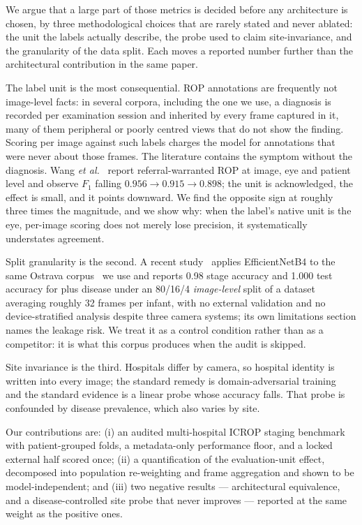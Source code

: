 \documentclass{article}
\begin{document}
We argue that a large part of those metrics is decided before any architecture is
chosen, by three methodological choices that are rarely stated and never ablated:
the unit the labels actually describe, the probe used to claim site-invariance,
and the granularity of the data split. Each moves a reported number further than
the architectural contribution in the same paper.

The label unit is the most consequential. ROP annotations are frequently not
image-level facts: in several corpora, including the one we use, a diagnosis is
recorded per examination session and inherited by every frame captured in it,
many of them peripheral or poorly centred views that do not show the finding.
Scoring per image against such labels charges the model for annotations that were
never about those frames. The literature contains the symptom without the
diagnosis. Wang \emph{et al.}~\cite{wang2021} report referral-warranted ROP at
image, eye and patient level and observe $F_1$ falling $0.956 \rightarrow 0.915
\rightarrow 0.898$; the unit is acknowledged, the effect is small, and it points
downward. We find the opposite sign at roughly three times the magnitude, and we
show why: when the label's native unit is the eye, per-image scoring does not
merely lose precision, it systematically understates agreement.

Split granularity is the second. A recent study~\cite{vahid2026} applies
EfficientNetB4 to the same Ostrava corpus~\cite{timkovic2024} we use and reports
0.98 stage accuracy and 1.000 test accuracy for plus disease under an 80/16/4
\emph{image-level} split of a dataset averaging roughly 32 frames per infant,
with no external validation and no device-stratified analysis despite three
camera systems; its own limitations section names the leakage risk. We treat it
as a control condition rather than as a competitor: it is what this corpus
produces when the audit is skipped.

Site invariance is the third. Hospitals differ by camera, so hospital identity is
written into every image; the standard remedy is domain-adversarial
training~\cite{ganin2016} and the standard evidence is a linear probe whose
accuracy falls. That probe is confounded by disease prevalence, which also varies
by site.

Our contributions are: (i) an audited multi-hospital ICROP staging benchmark with
patient-grouped folds, a metadata-only performance floor, and a locked external
half scored once; (ii) a quantification of the evaluation-unit effect, decomposed
into population re-weighting and frame aggregation and shown to be
model-independent; and (iii) two negative results --- architectural equivalence,
and a disease-controlled site probe that never improves --- reported at the same
weight as the positive ones.
\end{document}

